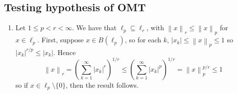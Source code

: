 \documentclass[11pt, a4paper]{memoir}
\newcommand{\norm}[1]{\ensuremath{\left\lVert#1\right\rVert}}
\theoremstyle{change}
\theoremstyle{plain}
\theoremstyle{nonumberplain}
\numberwithin{equation}{section}
\begin{document}
\subsection{Testing hypothesis of OMT}
\begin{enumerate}[nl,r]
    \item Let $1\leq p<r<\infty$.
        We have that $\ell_p\subseteq\ell_r$, with $\norm{x}_r\leq\norm{x}_p$ for $x\in\ell_p$.
        First, suppose $x\in B(\ell_p)$, so for each $k$, $|x_k|\leq\norm{x}_p\leq 1$ so $|x_k|^{r/p}\leq|x_k|$.
        Hence
        \begin{equation*}
            \norm{x}_r = \left(\sum_{k=1}^\infty|x_k|^r\right)^{1/r}\leq \left(\sum_{k=1}^\infty|x_k|^p\right)^{1/r}=\norm{x}_p^{p/r}\leq 1
        \end{equation*}
        so if $x\in\ell_p\setminus\{0\}$, then the result follows.


\end{enumerate}
\end{document}
